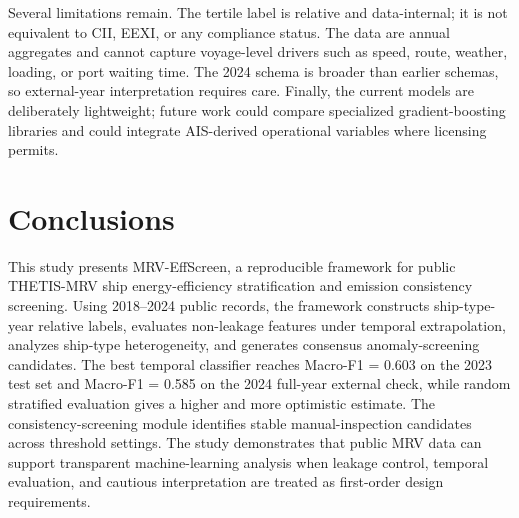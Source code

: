 \documentclass[preprints,article,submit,pdftex,oneauthor]{Definitions/mdpi}
\begin{document}
Several limitations remain. The tertile label is relative and data-internal; it is not equivalent to CII, EEXI, or any compliance status. The data are annual aggregates and cannot capture voyage-level drivers such as speed, route, weather, loading, or port waiting time. The 2024 schema is broader than earlier schemas, so external-year interpretation requires care. Finally, the current models are deliberately lightweight; future work could compare specialized gradient-boosting libraries and could integrate AIS-derived operational variables where licensing permits.

\section{Conclusions}

This study presents MRV-EffScreen, a reproducible framework for public THETIS-MRV ship energy-efficiency stratification and emission consistency screening. Using 2018--2024 public records, the framework constructs ship-type-year relative labels, evaluates non-leakage features under temporal extrapolation, analyzes ship-type heterogeneity, and generates consensus anomaly-screening candidates. The best temporal classifier reaches Macro-F1 = 0.603 on the 2023 test set and Macro-F1 = 0.585 on the 2024 full-year external check, while random stratified evaluation gives a higher and more optimistic estimate. The consistency-screening module identifies stable manual-inspection candidates across threshold settings. The study demonstrates that public MRV data can support transparent machine-learning analysis when leakage control, temporal evaluation, and cautious interpretation are treated as first-order design requirements.

\vspace{6pt}





\end{document}
